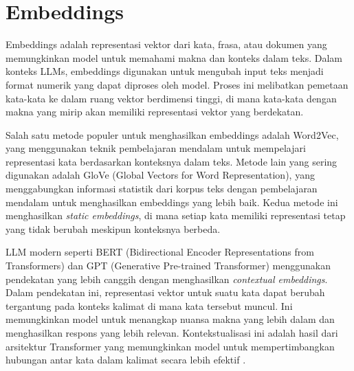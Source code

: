 \section{Embeddings}
\label{sec:embeddings}

Embeddings adalah representasi vektor dari kata, frasa, atau dokumen yang memungkinkan model untuk memahami makna dan konteks dalam teks. Dalam konteks LLMs, embeddings digunakan untuk mengubah input teks menjadi format numerik yang dapat diproses oleh model. Proses ini melibatkan pemetaan kata-kata ke dalam ruang vektor berdimensi tinggi, di mana kata-kata dengan makna yang mirip akan memiliki representasi vektor yang berdekatan.

Salah satu metode populer untuk menghasilkan embeddings adalah Word2Vec, yang menggunakan teknik pembelajaran mendalam untuk mempelajari representasi kata berdasarkan konteksnya dalam teks. Metode lain yang sering digunakan adalah GloVe (Global Vectors for Word Representation), yang menggabungkan informasi statistik dari korpus teks dengan pembelajaran mendalam untuk menghasilkan embeddings yang lebih baik. Kedua metode ini menghasilkan \textit{static embeddings}, di mana setiap kata memiliki representasi tetap yang tidak berubah meskipun konteksnya berbeda.

LLM modern seperti BERT (Bidirectional Encoder Representations from Transformers) dan GPT (Generative Pre-trained Transformer) menggunakan pendekatan yang lebih canggih dengan menghasilkan \textit{contextual embeddings}. Dalam pendekatan ini, representasi vektor untuk suatu kata dapat berubah tergantung pada konteks kalimat di mana kata tersebut muncul. Ini memungkinkan model untuk menangkap nuansa makna yang lebih dalam dan menghasilkan respons yang lebih relevan. Kontekstualisasi ini adalah hasil dari arsitektur Transformer yang memungkinkan model untuk mempertimbangkan hubungan antar kata dalam kalimat secara lebih efektif \parencite{vaswani2023attentionneed}.
